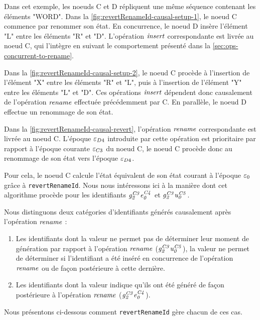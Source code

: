 Dans cet exemple, les noeuds C et D répliquent une même séquence contenant les éléments "WORD".
Dans la \autoref{fig:revertRenameId-causal-setup-1}, le noeud C commence par renommer son état.
En concurrence, le noeud D insère l'élément "L" entre les éléments "R" et "D".
L'opération $\mathit{insert}$ correspondante est livrée au noeud C, qui l'intègre en suivant le comportement présenté dans la \autoref{sec:ops-concurrent-to-rename}.

Dans la \autoref{fig:revertRenameId-causal-setup-2}, le noeud C procède à l'insertion de l'élément "X" entre les éléments "R" et "L", puis à l'insertion de l'élément "Y" entre les éléments "L" et "D".
Ces opérations $\mathit{insert}$ dépendent donc causalement de l'opération $\mathit{rename}$ effectuée précédemment par C.
En parallèle, le noeud D effectue un renommage de son état.

Dans la \autoref{fig:revertRenameId-causal-revert}, l'opération $\mathit{rename}$ correspondante est livrée au noeud C.
L'époque $\varepsilon_{D4}$ introduite par cette opération est prioritaire par rapport à l'époque courante $\varepsilon_{C3}$ du noeud C, le noeud C procède donc au renommage de son état vers l'époque $\varepsilon_{D4}$.

Pour cela, le noeud C calcule l'état équivalent de son état courant à l'époque $\varepsilon_{0}$ grâce à \texttt{revertRenameId}.
Nous nous intéressons ici à la manière dont cet algorithme procède pour les identifiants $\mathit{g}^{\mathit{C3}}_{\mathit{2}}\mathit{e}^{\mathit{C4}}_{\mathit{0}}$ et $\mathit{g}^{\mathit{C3}}_{\mathit{2}}\mathit{u}^{\mathit{C5}}_{\mathit{0}}$.

Nous distinguons deux catégories d'identifiants générés causalement après l'opération $\mathit{rename}$ :
\begin{enumerate}
    \item Les identifiants dont la valeur ne permet pas de déterminer leur moment de génération par rapport à l'opération $\mathit{rename}$ (\eg $\mathit{g}^{\mathit{C3}}_{\mathit{2}}\mathit{u}^{\mathit{C5}}_{\mathit{0}}$), \ie la valeur ne permet de déterminer si l'identifiant a été inséré en concurrence de l'opération $\mathit{rename}$ ou de façon postérieure à cette dernière.
    \item Les identifiants dont la valeur indique qu'ils ont été généré de façon postérieure à l'opération $\mathit{rename}$ ($\mathit{g}^{\mathit{C3}}_{\mathit{2}}\mathit{e}^{\mathit{C4}}_{\mathit{0}}$).
\end{enumerate}
Nous présentons ci-dessous comment \texttt{revertRenameId} gère chacun de ces cas.


